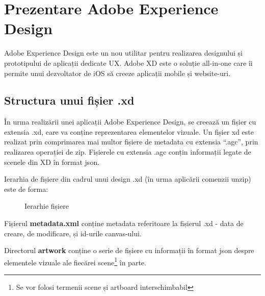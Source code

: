 \section{Prezentare Adobe Experience Design}

Adobe Experience Design este un nou utilitar pentru realizarea designului și prototipului de aplicații dedicate UX. Adobe XD este o soluție all-in-one care îi permite unui dezvoltator de iOS să creeze aplicații mobile și website-uri. 

\subsection{Structura unui fișier .xd}

În urma realizării unei aplicații Adobe Experience Design, se creează un fișier cu extensia .xd, care va conține reprezentarea elementelor vizuale. 
Un fișier xd este realizat prin comprimarea mai multor fișiere de metadata cu extensia “.agc”, prin realizarea operației de zip. Fișierele cu extensia .agc conțin informații legate de scenele din XD în format json.

Ierarhia de fișiere din cadrul unui design .xd (în urma aplicării comenzii unzip) este de forma:

\begin{figure}[!htbp]
\caption{Ierarhie fișiere} \label{fig:ierarhie}
\end{figure}

Fișierul \textbf{metadata.xml} conține metadata referitoare la fișierul .xd - data de creare, de modificare, și id-urile canvas-ului.

Directorul \textbf{artwork} conține o serie de fișiere cu informații în format json despre elementele vizuale ale fiecărei scene\footnote{Se vor folosi termenii scene și artboard interschimbabil} în parte. 

